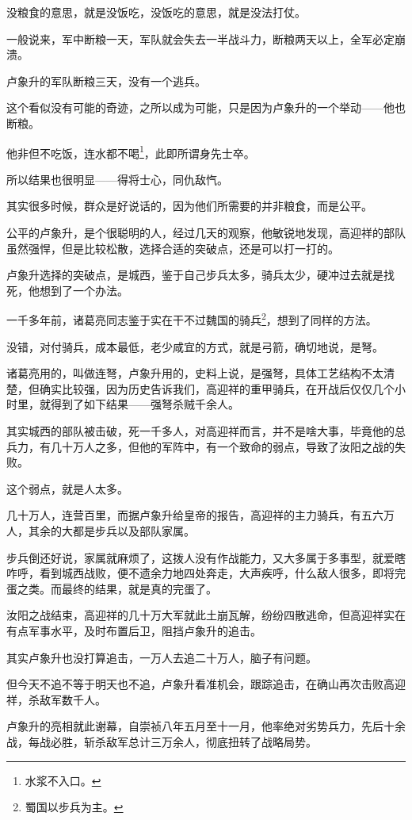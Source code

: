 \begin{multicols}{\theparacolNo}
		没粮食的意思，就是没饭吃，没饭吃的意思，就是没法打仗。

		一般说来，军中断粮一天，军队就会失去一半战斗力，断粮两天以上，全军必定崩溃。

		卢象升的军队断粮三天，没有一个逃兵。

		这个看似没有可能的奇迹，之所以成为可能，只是因为卢象升的一个举动——他也断粮。

		他非但不吃饭，连水都不喝\footnote{水浆不入口。}，此即所谓身先士卒。

		所以结果也很明显——得将士心，同仇敌忾。

		其实很多时候，群众是好说话的，因为他们所需要的并非粮食，而是公平。

		公平的卢象升，是个很聪明的人，经过几天的观察，他敏锐地发现，高迎祥的部队虽然强悍，但是比较松散，选择合适的突破点，还是可以打一打的。

		卢象升选择的突破点，是城西，鉴于自己步兵太多，骑兵太少，硬冲过去就是找死，他想到了一个办法。

		一千多年前，诸葛亮同志鉴于实在干不过魏国的骑兵\footnote{蜀国以步兵为主。}，想到了同样的方法。

		没错，对付骑兵，成本最低，老少咸宜的方式，就是弓箭，确切地说，是弩。

		诸葛亮用的，叫做连弩，卢象升用的，史料上说，是强弩，具体工艺结构不太清楚，但确实比较强，因为历史告诉我们，高迎祥的重甲骑兵，在开战后仅仅几个小时里，就得到了如下结果——强弩杀贼千余人。

		其实城西的部队被击破，死一千多人，对高迎祥而言，并不是啥大事，毕竟他的总兵力，有几十万人之多，但他的军阵中，有一个致命的弱点，导致了汝阳之战的失败。

		这个弱点，就是人太多。

		几十万人，连营百里，而据卢象升给皇帝的报告，高迎祥的主力骑兵，有五六万人，其余的大都是步兵以及部队家属。

		步兵倒还好说，家属就麻烦了，这拨人没有作战能力，又大多属于多事型，就爱瞎咋呼，看到城西战败，便不遗余力地四处奔走，大声疾呼，什么敌人很多，即将完蛋之类。而最终的结果，就是真的完蛋了。

		汝阳之战结束，高迎祥的几十万大军就此土崩瓦解，纷纷四散逃命，但高迎祥实在有点军事水平，及时布置后卫，阻挡卢象升的追击。

		其实卢象升也没打算追击，一万人去追二十万人，脑子有问题。

		但今天不追不等于明天也不追，卢象升看准机会，跟踪追击，在确山再次击败高迎祥，杀敌军数千人。

		卢象升的亮相就此谢幕，自崇祯八年五月至十一月，他率绝对劣势兵力，先后十余战，每战必胜，斩杀敌军总计三万余人，彻底扭转了战略局势。


\end{multicols}
